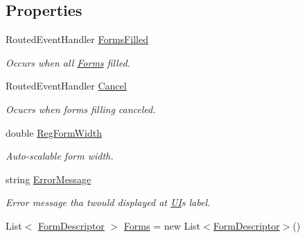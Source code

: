 \subsection*{Properties}
\begin{DoxyCompactItemize}
\item 
Routed\+Event\+Handler \mbox{\hyperlink{class_wpf_handler_1_1_u_i_1_1_controls_1_1_logon_1_1_registration_panel_a59719c447948da62701cfbc4e22e3c2c}{Forms\+Filled}}
\begin{DoxyCompactList}\small\item\em Occurs when all \mbox{\hyperlink{class_wpf_handler_1_1_u_i_1_1_controls_1_1_logon_1_1_registration_panel_ad67feb5ebac761e0e580b89a450b2e34}{Forms}} filled. \end{DoxyCompactList}\item 
Routed\+Event\+Handler \mbox{\hyperlink{class_wpf_handler_1_1_u_i_1_1_controls_1_1_logon_1_1_registration_panel_af504e42fbe82a5259b34a60671343c00}{Cancel}}
\begin{DoxyCompactList}\small\item\em Ocucrs when forms filling canceled. \end{DoxyCompactList}\item 
double \mbox{\hyperlink{class_wpf_handler_1_1_u_i_1_1_controls_1_1_logon_1_1_registration_panel_a91323c1b7f498e79c891dbb9a968537d}{Reg\+Form\+Width}}
\begin{DoxyCompactList}\small\item\em Auto-\/scalable form width. \end{DoxyCompactList}\item 
string \mbox{\hyperlink{class_wpf_handler_1_1_u_i_1_1_controls_1_1_logon_1_1_registration_panel_afaf0825575b64dcf5613320bbf6f5b10}{Error\+Message}}
\begin{DoxyCompactList}\small\item\em Error message tha twould displayed at \mbox{\hyperlink{namespace_wpf_handler_1_1_u_i}{UI}}\textquotesingle{}s label. \end{DoxyCompactList}\item 
List$<$ \mbox{\hyperlink{class_wpf_handler_1_1_u_i_1_1_auto_layout_1_1_form_descriptor}{Form\+Descriptor}} $>$ \mbox{\hyperlink{class_wpf_handler_1_1_u_i_1_1_controls_1_1_logon_1_1_registration_panel_ad67feb5ebac761e0e580b89a450b2e34}{Forms}} = new List$<$\mbox{\hyperlink{class_wpf_handler_1_1_u_i_1_1_auto_layout_1_1_form_descriptor}{Form\+Descriptor}}$>$()

\end{DoxyCompactItemize}

